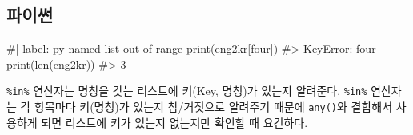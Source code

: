\documentclass[
  letterpaper,
]{book}
\newenvironment{Shaded}{\begin{snugshade}}{\end{snugshade}}
\newcommand{\NormalTok}[1]{\textcolor[rgb]{0.00,0.23,0.31}{#1}}
\begin{document}
\subsection{파이썬}

\begin{Shaded}
\begin{Highlighting}[]
\NormalTok{\#| label: py{-}named{-}list{-}out{-}of{-}range}
\NormalTok{print(eng2kr[\textquotesingle{}four\textquotesingle{}])}
\NormalTok{\#\textgreater{} KeyError: \textquotesingle{}four\textquotesingle{}}
\NormalTok{print(len(eng2kr))}
\NormalTok{\#\textgreater{} 3}
\end{Highlighting}
\end{Shaded}

\texttt{\%in\%} 연산자는 명칭을 갖는 리스트에 키(Key, 명칭)가 있는지
알려준다. \texttt{\%in\%} 연산자는 각 항목마다 키(명칭)가 있는지
참/거짓으로 알려주기 때문에 \texttt{any()}와 결합해서 사용하게 되면
리스트에 키가 있는지 없는지만 확인할 때 요긴하다. 
\end{document}
